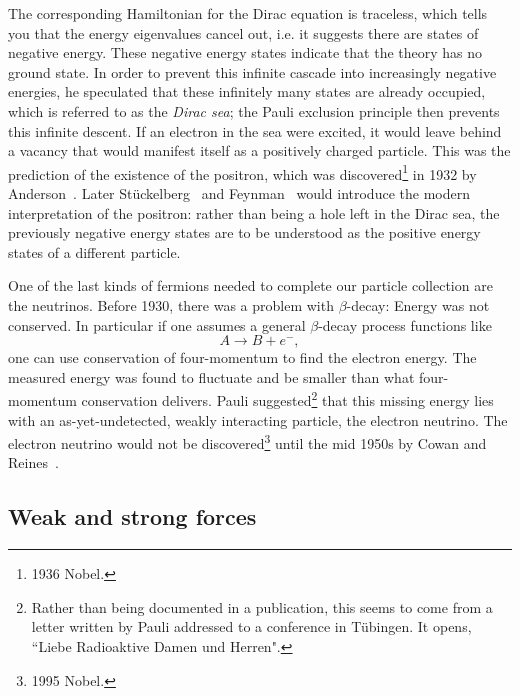 The corresponding Hamiltonian for the Dirac equation is traceless, which
tells you that the energy eigenvalues cancel out, i.e. 
it suggests there are states of
negative energy. These negative energy states indicate that the theory
has no ground state. In order to prevent this infinite cascade into increasingly
negative energies, he speculated that these infinitely many states are already
occupied, which is referred to as the {\it Dirac sea}; 
the Pauli exclusion principle then prevents this infinite descent. 
If an electron in the sea were excited, it would leave behind a vacancy
that would manifest itself as a positively charged particle. This was the
prediction of the existence of the positron, which
was discovered\footnote{1936 Nobel.} in 1932 by Anderson~\cite{Anderson:1933mb}.
Later St\"uckelberg~\cite{Stueckelberg:1941rg} and
Feynman~\cite{feynman_theory_1949} would introduce the modern interpretation
of the positron: rather than being a hole left in the Dirac sea,
the previously negative energy states are to be understood as the
positive energy states of a different particle.


One of the last kinds of fermions needed to complete our particle collection
are the neutrinos. Before 1930, there was a problem with $\beta$-decay: 
Energy was not conserved. In particular if one assumes
a general $\beta$-decay process functions like
\begin{equation}
  A\to B+e^-,
\end{equation}
one can use conservation of four-momentum to find the electron energy.
The measured energy was found to fluctuate and be smaller than what four-momentum
conservation delivers. Pauli
suggested\footnote{Rather than being documented in a publication, this seems to
come from a letter written by Pauli addressed to a conference in T\"ubingen.
It opens, ``Liebe Radioaktive Damen und Herren".} that this missing energy
lies with an as-yet-undetected, weakly interacting particle, the
electron neutrino. The electron neutrino would not be 
discovered\footnote{1995 Nobel.}
until the mid 1950s by Cowan and Reines~\cite{Cowan:1956rrn}.

\subsection{Weak and strong forces}

